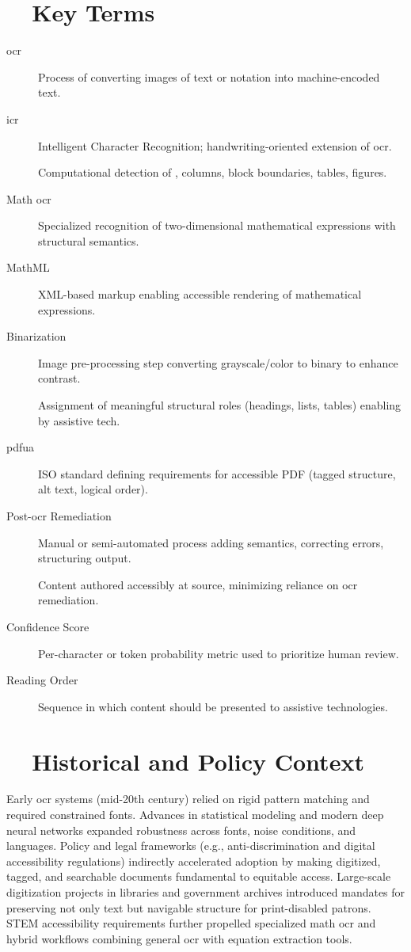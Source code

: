 \section{~~Key Terms}
\label{sec:ocr-key-terms}
\begin{description}
	\item[\gls{ocr}] Process of converting images of text or notation into machine-encoded text.
	\item[\gls{icr}] Intelligent Character Recognition; handwriting-oriented extension of \gls{ocr}.
	\item[] Computational detection of , columns, block boundaries, tables, figures.
	\item[Math \gls{ocr}] Specialized recognition of two-dimensional mathematical expressions with structural semantics.
	\item[MathML] XML-based markup enabling accessible rendering of mathematical expressions.
	\item[Binarization] Image pre-processing step converting grayscale/color to binary to enhance contrast.
	\item[] Assignment of meaningful structural roles (headings, lists, tables) enabling  by assistive tech.
	\item[\gls{pdfua}] ISO standard defining requirements for accessible PDF (tagged structure, alt text, logical order).
	\item[Post-\gls{ocr} Remediation] Manual or semi-automated process adding semantics, correcting errors, structuring output.
	\item[] Content authored accessibly at source, minimizing reliance on \gls{ocr} remediation.
	\item[Confidence Score] Per-character or token probability metric used to prioritize human review.
	\item[Reading Order] Sequence in which content should be presented to assistive technologies.
\end{description}

\section{~~Historical and Policy Context}
\label{sec:ocr-history}
Early \gls{ocr} systems (mid-20th century) relied on rigid pattern matching and required constrained fonts. Advances in statistical modeling and modern deep neural networks expanded robustness across fonts, noise conditions, and languages. Policy and legal frameworks (e.g., anti-discrimination and digital accessibility regulations) indirectly accelerated adoption by making digitized, tagged, and searchable documents fundamental to equitable access. Large-scale digitization projects in libraries and government archives introduced mandates for preserving not only text but navigable structure for print-disabled patrons. STEM accessibility requirements further propelled specialized math \gls{ocr} and hybrid workflows combining general \gls{ocr} with equation extraction tools.

